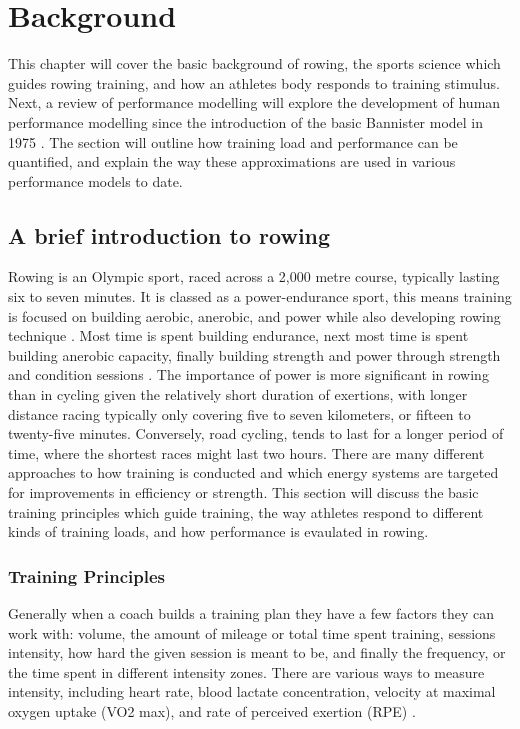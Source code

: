 \chapter{Background}
\label{chap:background}
This chapter will cover the basic background of rowing, the sports science which guides rowing training, and how an athletes body responds to training stimulus. Next, a review of performance modelling will explore the development of human performance modelling since the introduction of the basic Bannister model in 1975 \autocite{Bannister1976}. The section will outline how training load and performance can be quantified, and explain the way these approximations are used in various performance models to date.

\section{A brief introduction to rowing}
Rowing is an Olympic sport, raced across a 2,000 metre course, typically lasting six to seven minutes. It is classed as a power-endurance sport, this means training is focused on building aerobic, anerobic, and power while also developing rowing technique \autocite{Mäestu2005}. Most time is spent building endurance, next most time is spent building anerobic capacity, finally building strength and power through strength and condition sessions \autocite{Seiler2006}. The importance of power is more significant in rowing than in cycling given the relatively short duration of exertions, with longer distance racing typically only covering five to seven kilometers, or fifteen to twenty-five minutes. Conversely, road cycling, tends to last for a longer period of time, where the shortest races might last two hours. There are many different approaches to how training is conducted and which energy systems are targeted for improvements in efficiency or strength. This section will discuss the basic training principles which guide training, the way athletes respond to different kinds of training loads, and how performance is evaulated in rowing.

\subsection{Training Principles} \label{sub:training_principles}
Generally when a coach builds a training plan they have a few factors they can work with: volume, the amount of mileage or total time spent training, sessions intensity, how hard the given session is meant to be, and finally the frequency, or the time spent in different intensity zones. There are various ways to measure intensity, including heart rate, blood lactate concentration, velocity at maximal oxygen uptake (VO2 max), and rate of perceived exertion (RPE) \autocite{Rosenblat2019}. 

